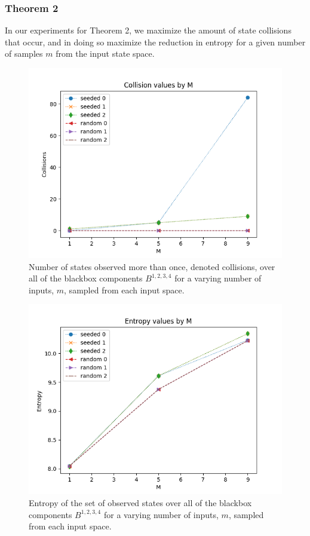 \documentclass[letterpaper,twocolumn,10pt]{article}
\begin{document}
\subsubsection{Theorem 2}

In our experiments for Theorem 2, we maximize the amount of state collisions that occur, and in doing so maximize the reduction in entropy for a given number of samples $m$ from the input state space. 

\begin{figure}
\begin{centering}
\includegraphics[width=\linewidth]{figs/collisions_0.png}
\end{centering}
\caption{\label{fig:col0} Number of states observed more than once, denoted collisions, over all of the blackbox components $B^{1,2,3,4}$ for a varying number of inputs, $m$, sampled from each input space.}
\end{figure}

\begin{figure}
\begin{centering}
\includegraphics[width=\linewidth]{figs/entropy_0.png}
\end{centering}
\caption{\label{fig:ent0} Entropy of the set of observed states over all of the blackbox components $B^{1,2,3,4}$ for a varying number of inputs, $m$, sampled from each input space.}
\end{figure}
\end{document}
